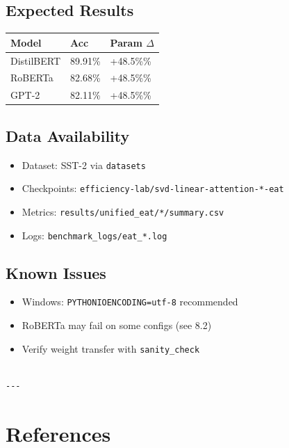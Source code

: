 \subsection{Expected Results}

\begin{table}[H]
\centering
\small
\begin{tabular}{lll}
\toprule
\textbf{Model} & \textbf{Acc} & \textbf{Param $\Delta$} \\
\midrule
DistilBERT & 89.91\% & +48.5\%\% \\
RoBERTa & 82.68\% & +48.5\%\% \\
GPT-2 & 82.11\% & +48.5\%\% \\
\bottomrule
\end{tabular}
\end{table}

\subsection{Data Availability}

\begin{itemize}
\item Dataset: SST-2 via \texttt{datasets}
\item Checkpoints: \texttt{efficiency-lab/svd-linear-attention-*-eat}
\item Metrics: \texttt{results/unified\_eat/*/summary.csv}
\item Logs: \texttt{benchmark\_logs/eat\_*.log}

\end{itemize}
\subsection{Known Issues}

\begin{itemize}
\item Windows: \texttt{PYTHONIOENCODING=utf-8} recommended
\item RoBERTa may fail on some configs (see  8.2)
\item Verify weight transfer with \texttt{sanity\_check}
\end{itemize}
\begin{lstlisting}

---
\end{lstlisting}


\section{References}

